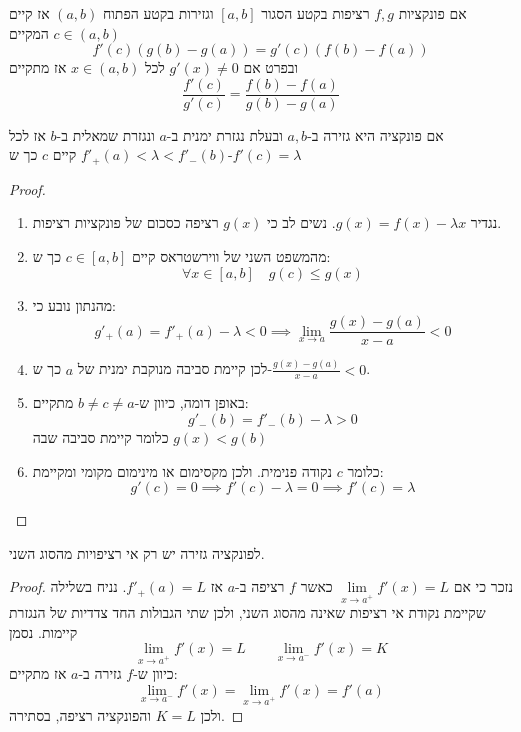 \documentclass{tstextbook}
\begin{document}
\begin{theorem}[קושי]
אם פונקציות \(f,g\) רציפות בקטע הסגור \([a,b]\) וגזירות בקטע הפתוח \((a,b)\) אז קיים \(c\in (a,b)\) המקיים $$f'(c)\left(g(b)-g(a)\right) = g'(c)\left(f(b) - f(a)\right)$$
ובפרט אם \(g'(x) \neq 0\) לכל \(x\in (a,b)\) אז מתקיים $$\frac{f'(c)}{g'(c)} = \frac{f(b) - f(a)}{g(b) - g(a)}$$

\end{theorem}
\begin{theorem}[דרבו]
אם פונקציה היא גזירה ב-\(a,b\) ובעלת נגזרת ימנית ב-\(a\) ונגזרת שמאלית ב-\(b\) אז לכל \(f'_{+}(a) < \lambda < f'_{-}(b)\) קיים \(c\) כך ש-\(f'(c)=\lambda\)

\end{theorem}
\begin{proof}
  \begin{enumerate}
    \item נגדיר \(g(x)=f(x)-\lambda x\). נשים לב כי \(g(x)\) רציפה כסכום של פונקציות רציפות. 


    \item מהמשפט השני של ווירשטראס קיים \(c \in [a,b]\) כך ש: 
$$\forall x \in [a,b]\quad  g(c)\leq g(x)$$


    \item מהנתון נובע כי: 
$$g'_{+}(a)=f'_{+}(a)-\lambda<0\implies \lim_{ x \to a } \frac{g(x)-g(a)}{x-a}<0$$


    \item לכן קיימת סביבה מנוקבת ימנית של \(a\) כך ש-\(\frac{g(x)-g(a)}{x-a}< 0\). 


    \item באופן דומה, כיוון ש-\(b\neq c \neq a\) מתקיים: 
$$g'_{-}(b)=f'_{-}(b)-\lambda>0$$
כלומר קיימת סביבה שבה \(g(x)<g(b)\)


    \item כלומר \(c\) נקודה פנימית. ולכן מקסימום או מינימום מקומי ומקיימת: 
$$g'(c)=0\implies f'(c)-\lambda=0\implies f'(c)=\lambda$$


  \end{enumerate}
\end{proof}
\begin{proposition}
לפונקציה גזירה יש רק אי רציפויות מהסוג השני.

\end{proposition}
\begin{proof}
נזכר כי אם \(\underset{ x \to a^{+} }{\lim }f'(x)=L\) כאשר \(f\) רציפה ב-\(a\) אז \(f'_{+}(a)=L\). נניח בשלילה שקיימת נקודת אי רציפות שאינה מהסוג השני, ולכן שתי הגבולות החד צדדיות של הנגזרת קיימות. נסמן
$$\lim_{ x \to a^{+} } f'(x)=L\qquad \lim_{ x \to a^{-} } f'(x)=K$$
כיוון ש-\(f\) גזירה ב-\(a\) אז מתקיים:
$$\lim_{ x \to a^{-} } f'(x)=\lim_{ x \to a^{+} } f'(x)=f'(a)$$
ולכן \(K=L\) והפונקציה רציפה, בסתירה.

\end{proof}
\end{document}
